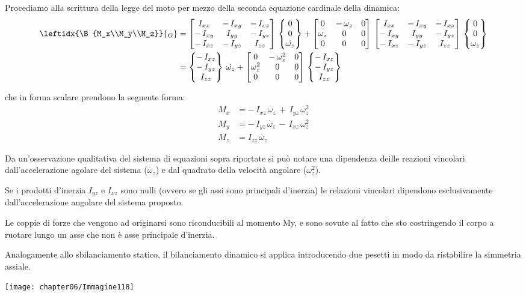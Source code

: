 	Procediamo alla scrittura della legge del moto per mezzo della seconda equazione cardinale della dinamica:
	\begin{align*}
	\leftidx{\B{M_x\\M_y\\M_z}}{_G} &= \M{I_{xx}&-\,I_{xy}&-\,I_{xz}\\-\,I_{xy}&I_{yy}&-\,I_{yz}\\-\,I_{xz}&-\,I_{yz}&I_{zz}}\,\B{0\\0\\\dot{\omega_z}} + \M{0&-\,\omega_z&0\\\omega_z&0&0\\0&0&0}\, \M{I_{xx}&-\,I_{xy}&-\,I_{xz}\\-\,I_{xy}&I_{yy}&-\,I_{yz}\\-\,I_{xz}&-\,I_{yz}&I_{zz}}\,\B{0\\0\\\omega_z}\\
	&= \B{-\,I_{xz}\\-\,I_{yz}\\I_{zz}}\,\dot{\omega_z} + \M{0& -\,\omega_z^2&0\\\omega_z^2&0&0\\0&0&0}\,\B{-\,I_{xz}\\-\,I_{yz}\\I_{zz}}
	\end{align*}
	
	che in forma scalare prendono la seguente forma:
	\begin{align*}
	M_x &= -\,I_{xz}\,\dot{\omega_z}\,+\,I_{yz}\,\omega_z^2\\
	M_y &= -\,I_{yz}\,\dot{\omega_z}\,-\,I_{xz}\,\omega_z^2\\
	M_z &= I_{zz}\,\dot{\omega_z}
\end{align*}	

\begin{minipage}{.65\textwidth}

Da un'osservazione qualitativa del sistema di equazioni sopra riportate si può notare una dipendenza deille reazioni vincolari dall'accelerazione agolare del sistema ($\dot{\omega_z}$) e dal quadrato della velocità angolare ($\omega_z^2$).

Se i prodotti d'inerzia $I_{yz}$ e $I_{xz}$ sono nulli (ovvero se gli assi sono principali d'inerzia) le relazioni vincolari dipendono esclusivamente dall'accelerazione angolare del sistema proposto.

Le coppie di forze che vengono ad originarsi sono riconducibili al momento My, e sono sovute al fatto che sto costringendo il corpo a ruotare lungo un asse che non è asse principale d'inerzia.

Analogamente allo sbilanciamento statico, il bilanciamento dinamico si applica introducendo due pesetti in modo da ristabilire la simmetria assiale.
\end{minipage}
\hfill
\begin{minipage}{.35\textwidth}
\centering
\texttt{[image: chapter06/Immagine118]}
\end{minipage}

